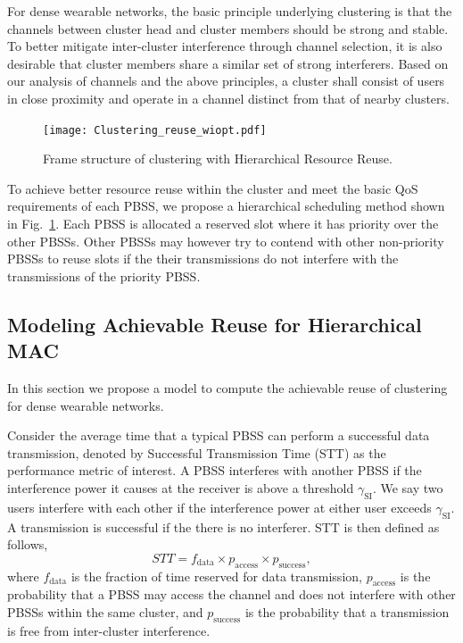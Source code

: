 \documentclass[10pt, conference, letterpaper]{IEEEtran}
\DeclareMathOperator*{\SI}{\mathrm{SI}}
\begin{document}
For dense wearable networks, the basic principle underlying clustering is that the channels between cluster head and cluster members should be strong and stable. 
To better mitigate inter-cluster interference through channel selection, it is also desirable that cluster members share a similar set of strong interferers. 
Based on our analysis of channels and the above principles, a cluster shall consist of users in close proximity and operate in a channel distinct from that of nearby clusters. 


\begin{figure}
	\centering
	\texttt{[image: Clustering\_reuse\_wiopt.pdf]}
	\caption{Frame structure of clustering with Hierarchical Resource Reuse.}
	\label{fig:clustering:reuse}
\end{figure}


To achieve better resource reuse within the cluster and meet the basic QoS requirements of each PBSS, we propose a hierarchical scheduling method shown in Fig.~\ref{fig:clustering:reuse}. 
Each PBSS is allocated a reserved slot where it has priority over the other PBSSs. 
Other PBSSs may however try to contend with other non-priority PBSSs to reuse slots if the their transmissions do not interfere with the transmissions of the priority PBSS.


\subsection{Modeling Achievable Reuse for Hierarchical MAC}
In this section we propose a model to compute the achievable reuse of clustering for dense wearable networks.


Consider the average time that a typical PBSS can perform a successful data transmission, denoted by Successful Transmission Time (STT) as the performance metric of interest.
A PBSS interferes with another PBSS if the interference power it causes at the receiver is above a threshold $\gamma_{\SI}$.
We say two users interfere with each other if the interference power at either user exceeds $\gamma_{\SI}$. 
A transmission is successful if the there is no interferer.
STT is then defined as follows, 
\begin{equation*}
STT = f_{\mathrm{data}}\times p_{\mathrm{access}} \times p_{\mathrm{success}},
\end{equation*}
where $f_{\mathrm{data}}$ is the fraction of time reserved for data transmission, $p_{\mathrm{access}}$ is the probability that a PBSS may access the channel and does not interfere with other PBSSs within the same cluster,
and $p_{\mathrm{success}}$ is the probability that a transmission is free from inter-cluster interference.
\end{document}
